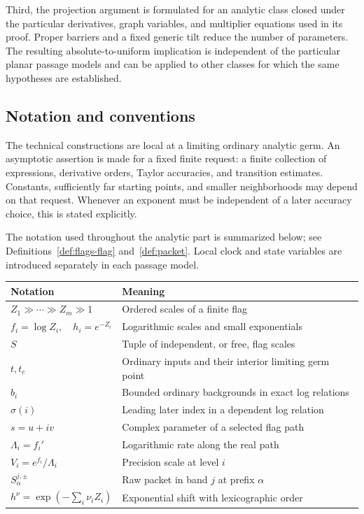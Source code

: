 Third, the projection argument is formulated for an analytic class
closed under the particular derivatives, graph variables, and
multiplier equations used in its proof. Proper barriers and a fixed
generic tilt reduce the number of parameters. The resulting
absolute-to-uniform implication is independent of the particular
planar passage models and can be applied to other classes for which
the same hypotheses are established.

\subsection{Notation and conventions}

The technical constructions are local at a limiting ordinary analytic
germ. An asymptotic assertion is made for a fixed finite request:
a finite collection of expressions, derivative orders, Taylor
accuracies, and transition estimates. Constants, sufficiently far
starting points, and smaller neighborhoods may depend on that
request. Whenever an exponent must be independent of a later
accuracy choice, this is stated explicitly.

The notation used throughout the analytic part is summarized below;
see Definitions~\ref{def:flags-flag} and~\ref{def:packet}.
Local clock and state variables are introduced separately in each
passage model.

\begin{center}
\begin{tabular}{@{}ll@{}}
\toprule
Notation & Meaning\\
\midrule
\(Z_1\gg\cdots\gg Z_m\gg1\) & Ordered scales of a finite flag\\
\(f_i=\log Z_i,\quad h_i=e^{-Z_i}\) & Logarithmic scales and small exponentials\\
\(S\) & Tuple of independent, or free, flag scales\\
\(t,t_c\) & Ordinary inputs and their interior limiting germ point\\
\(b_i\) & Bounded ordinary backgrounds in exact log relations\\
\(\sigma(i)\) & Leading later index in a dependent log relation\\
\(s=u+iv\) & Complex parameter of a selected flag path\\
\(\Lambda_i=f_i'\) & Logarithmic rate along the real path\\
\(V_i=e^{f_i}/\Lambda_i\) & Precision scale at level \(i\)\\
\(S^{j,\pm}_\alpha\) & Raw packet in band \(j\) at prefix \(\alpha\)\\
\(h^\nu=\exp(-\sum_i\nu_iZ_i)\) & Exponential shift with lexicographic order\\
\bottomrule
\end{tabular}
\end{center}

